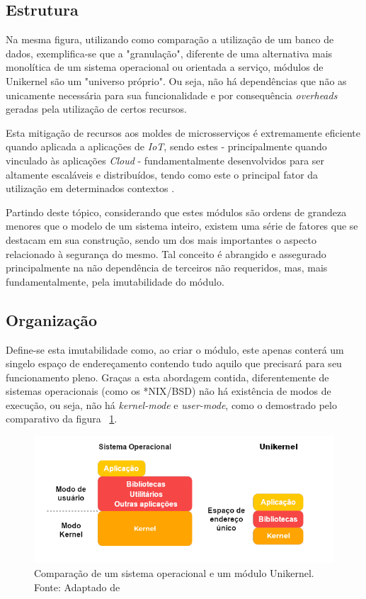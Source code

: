 \documentclass[12pt]{article}
\begin{document}
\subsection{Estrutura}

 Na mesma figura, utilizando como comparação a utilização de um banco de dados, exemplifica-se que a "granulação", diferente de uma alternativa mais monolítica de um sistema operacional ou orientada a serviço, módulos de Unikernel são um "universo próprio". Ou seja, não há dependências que não as unicamente necessária para sua funcionalidade e por consequência \textit{overheads} geradas pela utilização de certos recursos. 
 
 Esta mitigação de recursos aos moldes de microsserviços é extremamente eficiente quando aplicada a aplicações de \textit{IoT}, sendo estes - principalmente quando vinculado às aplicações \textit{Cloud} - fundamentalmente desenvolvidos para ser altamente escaláveis e distribuídos, tendo como este o principal fator da utilização em determinados contextos \cite{fraga:120}.
 
 Partindo deste tópico, considerando que estes módulos são ordens de grandeza menores que o modelo de um sistema inteiro, existem uma série de fatores que se destacam em sua construção, sendo um dos mais importantes o aspecto relacionado à segurança do mesmo. Tal conceito é abrangido e assegurado principalmente na não dependência de terceiros não requeridos, mas, mais fundamentalmente, pela imutabilidade do módulo. 
 
 \subsection{Organização}
 
 Define-se esta imutabilidade como, ao criar o módulo, este apenas conterá um singelo espaço de endereçamento contendo tudo aquilo que precisará para seu funcionamento pleno. Graças a esta abordagem contida, diferentemente de sistemas operacionais (como os *NIX/BSD) não há existência de modos de execução, ou seja, não há \textit{kernel-mode} e \textit{user-mode}, como o demostrado pelo comparativo da figura ~\ref{fig:fig2}.

\begin{figure}[H]
\centering
\includegraphics[width=.8\textwidth]{fig2.png}
\caption{Comparação de um sistema operacional e um módulo Unikernel. Fonte: Adaptado de \cite{fraga:120}}
\label{fig:fig2}
\end{figure}
\end{document}
